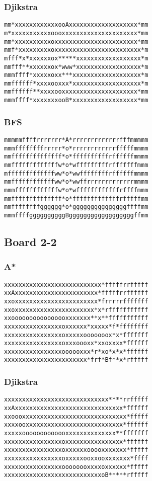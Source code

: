 \documentclass[11pt,a4paper]{article}
\begin{document}
\subsubsection*{Djikstra}
\begin{lstlisting}
mm*xxxxxxxxxxxxooAxxxxxxxxxxxxxxxxxxx*mm
m*xxxxxxxxxxxoooxxxxxxxxxxxxxxxxxxxxx*mm
mm*xxxxxxxxxxoxxxxxxxxxxxxxxxxxxxxxxx*mm
mmf*xxxxxxxxxoxxxxxxxxxxxxxxxxxxxxxxxx*m
mfff*x*xxxxxxox*****xxxxxxxxxxxxxxxxxx*m
mmfff**xxxxxxox*www*xxxxxxxxxxxxxxxxxx*m
mmmffff*xxxxxoxx***xxxxxxxxxxxxxxxxxxx*m
mmffffff*xxxxooxxx*xxxxxxxxxxxxxxxxxxx*m
mmffffff**xxxxooxxxxxxxxxxxxxxxxxxxxx*mm
mmmffff*xxxxxxxooB*xxxxxxxxxxxxxxxxxx*mm
\end{lstlisting}

\subsubsection*{BFS}
\begin{lstlisting}
mmmmmffffrrrrrrr*A*rrrrrrrrrrrrrfffmmmmm
mmmffffffffrrrrr*o*rrrrrrrrrrrrfffffmmmm
mmffffffffffffff*o*ffffffffffrffffffmmmm
mmfffffffffffffw*o*wfffffffffrfffffffmmm
mfffffffffffffww*o*wwffffffffrffffffmmmm
mmffffffffffffww*o*wwffrrrrrrrrrrrrrmmmm
mmmffffffffffffw*o*wffffffffffffrffffmmm
mmffffffffffffff*o*fffffffffffffrfffffmm
mmffffffffgggggg*o*gggggggggggggggffffmm
mmmffffggggggggggBggggggggggggggggggffmm
\end{lstlisting}


\subsection*{Board 2-2}
\subsubsection*{A*}
\begin{lstlisting}
xxxxxxxxxxxxxxxxxxxxxxxxxxx*fffffrrfffff
xxAxxxxxxxxxxxxxxxxxxxxxxx*fffffrrffffff
xxoxxxxxxxxxxxxxxxxxxxxxxx*frrrrrfffffff
xxoxxxxxxxxxxxxxxxxxxxxxx*x*rfffffffffff
xxoooooooooooooooxxxxxxx**x**fffffffffff
xxxxxxxxxxxxxxxxoxxxxxx*xxxxx*f*ffffffff
xxxxxxxxxxxxxxxxoxxxxxooooooox*x*fffffff
xxxxxxxxxxxxxxxxoxxxoooxx*xxoxxxx*ffffff
xxxxxxxxxxxxxxxxoooooxxx*r*xo*x*x*ffffff
xxxxxxxxxxxxxxxxxxxxxxx*frf*Bf**x*rfffff
\end{lstlisting}

\subsubsection*{Djikstra}
\begin{lstlisting}
xxxxxxxxxxxxxxxxxxxxxxxxxxxxx****rrfffff
xxAxxxxxxxxxxxxxxxxxxxxxxxxxxxxxx*ffffff
xxoooxxxxxxxxxxxxxxxxxxxxxxxxxxxxx*fffff
xxxxooxxxxxxxxxxxxxxxxxxxxxxxxxxx*ffffff
xxxxxooooooooooooxxxxxxxxxxxxxx**fffffff
xxxxxxxxxxxxxxxxoxxxxxxxxxxxxxxxx*ffffff
xxxxxxxxxxxxxxxxoxxxxxxooooxxxxxxx*fffff
xxxxxxxxxxxxxxxxoxxxxxooxxooxxxxxxx*ffff
xxxxxxxxxxxxxxxxoooooooxxxxoxxxxxx*fffff
xxxxxxxxxxxxxxxxxxxxxxxxxxxoB*****rfffff
\end{lstlisting}
\end{document}

